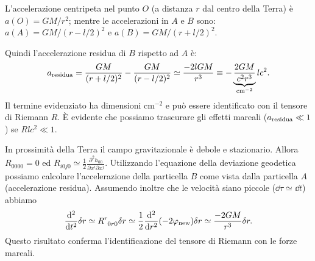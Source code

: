 L'accelerazione centripeta nel punto $O$ (a distanza $r$ dal centro della Terra)
è $a(O) = GM/r^2$; mentre le accelerazioni in $A$ e $B$ sono: $a(A) =
GM/(r-l/2)^2$ e $a(B) = GM/(r+l/2)^2$.

Quindi l'accelerazione residua di $B$ rispetto ad $A$ è:
\begin{equation}
  a_{\textup{residua}} = \frac{GM}{(r+l/2)^2} - \frac{GM}{(r-l/2)^2} \simeq
  \frac{-2lGM}{r^3} \equiv - \underbrace{\frac{2GM}{c^2
      r^3}}_{\si[per-mode=reciprocal]{\per \centi\metre \squared}}
  lc^2.
\end{equation}
Il termine evidenziato ha dimensioni cm$^{-2}$ e può essere identificato con il
tensore di Riemann $R$.  È evidente che possiamo trascurare gli effetti mareali
($a_{\textup{residua}} \ll 1 $) se $ R l c^2 \ll 1 $.

In prossimità della Terra il campo gravitazionale è debole e stazionario.
Allora $R_{0000}=0$ ed $R_{i0j0} \simeq \frac{1}{2} \frac{\partial ^2
  h_{00}}{\partial x^i \partial x^j}$.  Utilizzando l'equazione della deviazione
geodetica possiamo calcolare l'accelerazione della particella $B$ come vista
dalla particella $A$ (accelerazione residua).  Assumendo inoltre che le velocità
siano piccole ($\dd\tau \simeq \dd t$) abbiamo
\begin{equation}
  \toder[2]{}{t} \delta r \simeq \tensor{R}{^r_{0r0}} \delta r \simeq
  \frac{1}{2} \toder[2]{}{r} (-2 \phi_{\textup{new}}) \delta r \simeq
  \frac{-2GM}{r^3} \delta r.
\end{equation}
Questo risultato conferma l'identificazione del tensore di Riemann con le forze
mareali.

